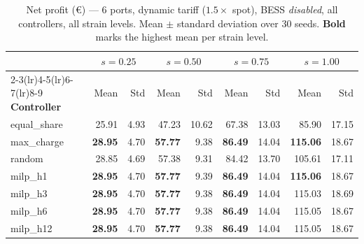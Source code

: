 \begin{table}[!htb]
\centering
\caption{Net profit (€) — 6 ports, dynamic tariff ($1.5\times$ spot),
         BESS \emph{disabled}, all controllers, all strain levels.
         Mean $\pm$ standard deviation over 30 seeds.
         \textbf{Bold} marks the highest mean per strain level.}
\label{tab:gc_dyn_nobess_ms_6p}
\setlength{\tabcolsep}{4.5pt}
\begin{tabular}{l rr rr rr rr}
\toprule
 & \multicolumn{2}{c}{$s=0.25$}
 & \multicolumn{2}{c}{$s=0.50$}
 & \multicolumn{2}{c}{$s=0.75$}
 & \multicolumn{2}{c}{$s=1.00$} \\
\cmidrule(lr){2-3}\cmidrule(lr){4-5}\cmidrule(lr){6-7}\cmidrule(lr){8-9}
\textbf{Controller} & Mean & Std & Mean & Std & Mean & Std & Mean & Std \\
\midrule
equal\_share &  25.91 &  4.93 &  47.23 & 10.62 &  67.38 & 13.03 &  85.90 & 17.15 \\
max\_charge  & \textbf{28.95} &  4.70 & \textbf{57.77} &  9.38 & \textbf{86.49} & 14.04 & \textbf{115.06} & 18.67 \\
random       &  28.85 &  4.69 &  57.38 &  9.31 &  84.42 & 13.70 & 105.61 & 17.11 \\
milp\_h1     & \textbf{28.95} &  4.70 & \textbf{57.77} &  9.39 & \textbf{86.49} & 14.04 & \textbf{115.06} & 18.67 \\
milp\_h3     & \textbf{28.95} &  4.70 & \textbf{57.77} &  9.38 & \textbf{86.49} & 14.04 & 115.03 & 18.69 \\
milp\_h6     & \textbf{28.95} &  4.70 & \textbf{57.77} &  9.38 & \textbf{86.49} & 14.04 & 115.05 & 18.67 \\
milp\_h12    & \textbf{28.95} &  4.70 & \textbf{57.77} &  9.38 & \textbf{86.49} & 14.04 & 115.05 & 18.67 \\
\bottomrule
\end{tabular}
\end{table}

